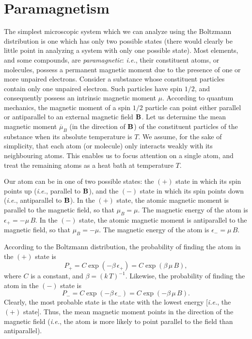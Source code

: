 \section{Paramagnetism}
The simplest microscopic system which we can analyze using the Boltzmann distribution
is one
which has only two possible states (there would clearly be little point in analyzing
a system with only one possible state). Most elements, and some compounds, are
{\em paramagnetic}: {\em i.e.}, their constituent atoms, or molecules,
 possess a permanent
magnetic moment due to the presence of one or more unpaired electrons. Consider a
substance  whose constituent
particles contain only one unpaired electron. Such particles  have spin
$1/2$, and consequently possess  an intrinsic magnetic moment $\mu$. 
According to quantum mechanics, the magnetic moment of a spin $1/2$ particle
can 
point either parallel or antiparallel to an external magnetic field ${\bf B}$. 
Let us determine the mean magnetic moment $\overline{\mu}_B$ (in the direction
of ${\bf B}$) of the constituent particles of
the substance when its  absolute temperature is $T$. 
We assume, for the sake of simplicity,  that each atom (or molecule)
only interacts weakly
with its neighbouring atoms. This enables us to  focus attention on a single atom, and
treat the remaining atoms as a heat bath at temperature $T$.

Our atom can be in one of two possible states: the $(+)$ state in which its spin
points up ({\em i.e.}, parallel to ${\bf B}$), and the $(-)$ state in which its
spin points down ({\em i.e.}, antiparallel to ${\bf B}$). In the $(+)$ state,
the atomic magnetic moment is parallel to the magnetic field, so that
$\mu_B = \mu$. The magnetic energy of the atom is $\epsilon_{+} = - \mu \, B$. 
In the $(-)$ state, the atomic magnetic moment is antiparallel to the magnetic
field, so that $\mu_B = -\mu$. The magnetic energy of the atom is 
$\epsilon_{-} = \mu \, B$.

According to the Boltzmann distribution, the probability of finding the atom
in the $(+)$ state is
\begin{equation}
P_{+} = C\exp(-\beta\,\epsilon_{+}) = C\exp(\beta\, \mu \,B),
\end{equation}
where $C$ is a constant, and $\beta = (k\,T)^{-1}$. 
Likewise, the probability of finding the atom in the $(-)$ state is
\begin{equation}
P_{-} = C\exp(-\beta\,\epsilon_{-}) = C\exp(-\beta\, \mu\, B).
\end{equation}
Clearly, the most probable
state is  the state with the lowest energy [{\em i.e.}, the $(+)$ state].
Thus, the mean magnetic moment points in the direction of the magnetic field
({\em i.e.}, the atom is more likely to point parallel to the field than antiparallel).

